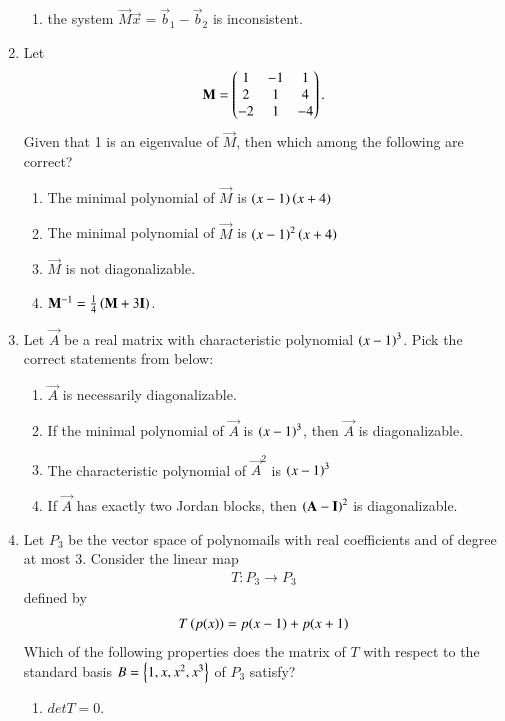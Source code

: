 \begin{enumerate}[label=\thesection.\arabic*.,ref=\thesection.\theenumi]
\begin{enumerate}
\item the system $\vec{M}\vec{x} = \vec{b}_1-\vec{b}_2$ is inconsistent. 
\end{enumerate}
%
\item Let 
\begin{align}
\mathbf{M} = \begin{pmatrix}
1 & -1 & 1 \\
2 & 1 & 4 \\
-2 & 1 & -4 
\end{pmatrix}.
\end{align}
Given that 1 is an eigenvalue of $\vec{M}$, then which among the following
are correct?
\begin{enumerate}
\item The minimal polynomial of  $\vec{M}$ is $\left(x-1\right)\left(x+4\right)$ 
\item The minimal polynomial of  $\vec{M}$ is $\left(x-1\right)^2\left(x+4\right)$ 
\item   $\vec{M}$ is not diagonalizable.
\item $\mathbf{M}^{-1} = \frac{1}{4}\left(\mathbf{M}+3\mathbf{I}\right)$. 
\end{enumerate}
%
\solution

\item Let $\vec{A}$ be a real matrix with characteristic polynomial $\left(x-1\right)^3$.  Pick the correct statements from below:
\begin{enumerate}
\item $\vec{A}$ is necessarily diagonalizable.
\item If the minimal polynomial of  $\vec{A}$ is $\left(x-1\right)^3$, then  $\vec{A}$ is diagonalizable.
\item  The characteristic polynomial of  $\vec{A}^2$ is $\left(x-1\right)^3$
\item If $\vec{A}$ has exactly two Jordan blocks, then $\left(\mathbf{A}-\mathbf{I}\right)^2$ is diagonalizable. 
\end{enumerate}
\solution

%
\item Let $P_3$ be the vector space of polynomails with real coefficients and of degree at most 3.  Consider the linear map
\begin{align}
T:P_3\to P_3
\end{align}
defined by 
\begin{align}
T\left(p(x)\right) = p(x-1)+p(x+1)
\end{align}
%
Which of the following properties does the matrix of $T$ with respect to the standard basis
$B = \left\{1,x,x^2,x^3\right\}$ of $P_3$ satisfy?
\begin{enumerate}
\item $det T = 0$.

\end{enumerate}
\end{enumerate}
